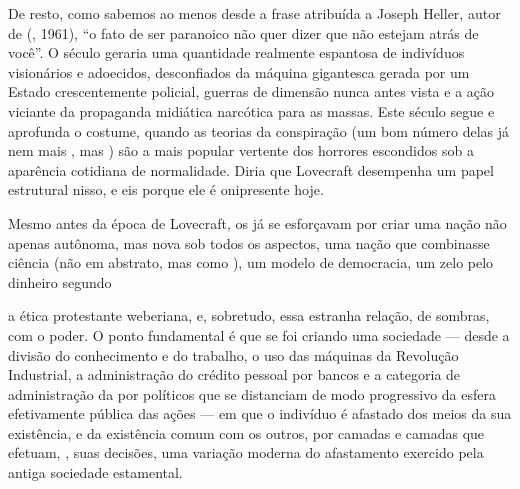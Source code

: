 \begin{multicols}{2}
De resto, como sabemos ao menos desde a frase atribuída a Joseph Heller,
autor de {} ({}, 1961), ``o fato de ser
paranoico não quer dizer que não estejam atrás de você''. O século 
geraria uma quantidade realmente espantosa de indivíduos visionários e
adoecidos, desconfiados da máquina gigantesca gerada por um Estado
crescentemente policial, guerras de dimensão nunca antes vista e a ação
viciante da propaganda midiática narcótica para as massas. Este século
 segue e aprofunda o costume, quando as teorias da conspiração (um
bom número delas já nem mais {}, mas {}) são a mais popular vertente dos horrores escondidos sob a
aparência cotidiana de normalidade. Diria que Lovecraft desempenha um
papel estrutural nisso, 
e eis porque ele é
onipresente hoje.


Mesmo antes da época de Lovecraft, os  já se esforçavam por criar uma nação não apenas autônoma, mas nova sob todos os aspectos, uma nação que
combinasse ciência (não em abstrato, mas como {}),
um modelo de democracia, um
zelo pelo dinheiro segundo

\vspace{\baselineskip}

{\small{}}

\vspace{\baselineskip}

\noindent{}a ética protestante weberiana, e, sobretudo, essa estranha relação, de sombras, com o
poder. O ponto fundamental é que se foi criando uma sociedade --- desde
a divisão do conhecimento e do trabalho, o uso das máquinas da Revolução
Industrial, a administração do crédito pessoal por bancos e a categoria
de administração da {} por políticos que se distanciam
de modo progressivo da esfera efetivamente pública das ações --- em que
o indivíduo é afastado dos meios da sua existência, e da existência
comum com os outros, por camadas e camadas que efetuam, {}, suas decisões, uma variação moderna do
afastamento exercido pela antiga sociedade estamental.



\end{multicols}
